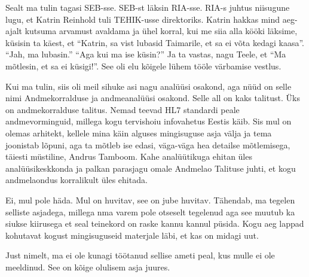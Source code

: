 Sealt ma tulin tagasi SEB-sse. SEB-st läksin RIA-sse. RIA-s juhtus niisugune lugu, et Katrin Reinhold tuli TEHIK-usse direktoriks. Katrin hakkas mind aeg-ajalt kutsuma arvamust avaldama ja ühel korral, kui me siia alla kööki läksime, küsisin ta käest, et \enquote{Katrin, sa vist lubasid Taimarile, et sa ei võta kedagi kaasa}. \enquote{Jah, ma lubasin.} \enquote{Aga kui ma ise küsin?} Ja ta vastas, nagu Teele, et \enquote{Ma mõtlesin, et sa ei küsigi!}. See oli elu kõigele lühem tööle värbamise vestlus. 

Kui ma tulin, siis oli meil sihuke asi nagu analüüsi osakond, aga nüüd on selle nimi Andmekorralduse ja andmeanalüüsi osakond. Selle all on kaks talitust. Üks on andmekorralduse talitus. Nemad teevad HL7 standardi peale andmevorminguid, millega kogu tervishoiu infovahetus Eestis käib. Sis mul on olemas arhitekt, kellele mina käin alguses mingisuguse asja välja ja tema joonistab lõpuni, aga ta mõtleb ise edasi, väga-väga hea detailse mõtlemisega, täiesti müstiline, Andrus Tamboom. Kahe analüütikuga ehitan üles  analüüsikeskkonda ja palkan parasjagu omale Andmelao Talituse juhti, et kogu andmelaondus korralikult üles ehitada. 


Ei, mul pole häda. Mul on huvitav, see on jube huvitav. Tähendab, ma tegelen selliste asjadega, millega nma varem pole otseselt tegelenud aga see muutub ka siukse kiirusega et seal teinekord on raske kannu kannul püsida. Kogu aeg lappad kohutavat kogust mingisuguseid materjale läbi, et kas on midagi uut. 


Just nimelt, ma ei ole kunagi töötanud sellise ameti peal, kus mulle ei ole meeldinud. See on kõige olulisem asja juures. 